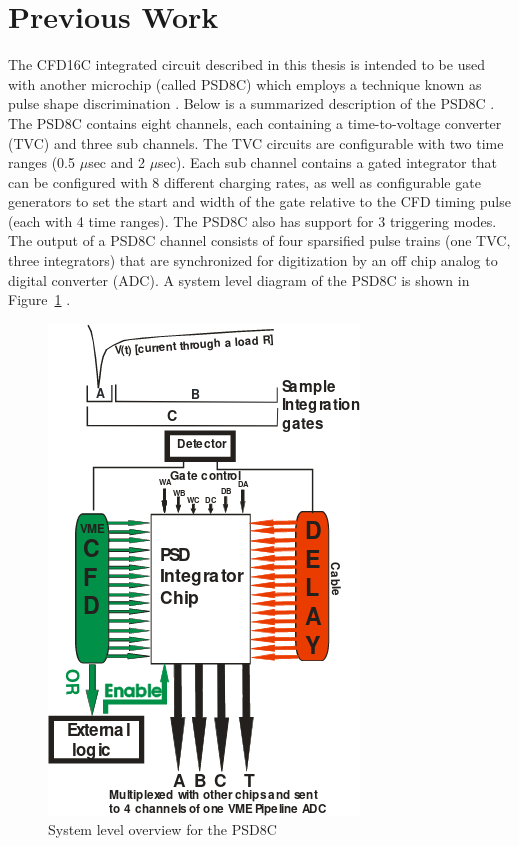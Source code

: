 \documentclass[12pt,oneside,final]{siuethesis}
\theoremstyle{definition}
\begin{document}
\section{Previous Work}
\par The CFD16C integrated circuit described in this thesis is intended to be used with another microchip (called PSD8C) which employs a technique known as pulse shape discrimination \cite{HALL}. Below is a summarized description of the PSD8C \cite{PROCTOR}. The PSD8C contains eight channels, each containing a time-to-voltage converter (TVC) and three sub channels. The TVC circuits are configurable with two time ranges (0.5 $\mu$sec and 2 $\mu$sec). Each sub channel contains a gated integrator that can be configured with 8 different charging rates, as well as configurable gate generators to set the start and width of the gate relative to the CFD timing pulse (each with 4 time ranges). The PSD8C also has support for 3 triggering modes. The output of a PSD8C channel consists of four sparsified pulse trains (one TVC, three integrators) that are synchronized for digitization by an off chip analog to digital converter (ADC). A system level diagram of the PSD8C is shown in Figure~\ref{fig:PSD} \cite{PSD-NSF}.\newpage

\begin{figure}[ht]
\centering
\includegraphics[scale=1,keepaspectratio=true]{images/PSD_block.png} 
\caption{System level overview for the PSD8C}
\label{fig:PSD}
\end{figure}
\end{document}
